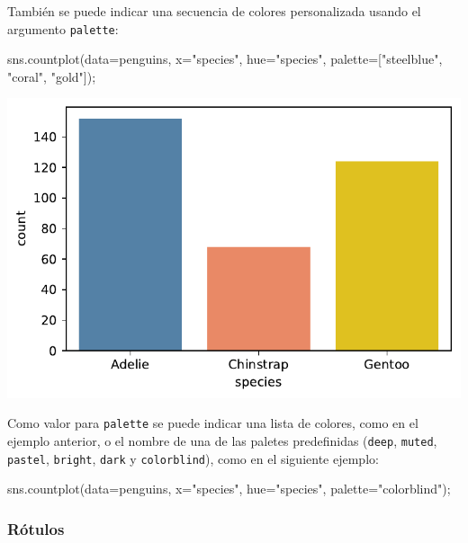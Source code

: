 \documentclass[
  a4paper,
  noprof,
  12pt,
  notoc,
  nosols,
  nobib]{mnye}
\newenvironment{Shaded}{\begin{snugshade}}{\end{snugshade}}
\newcommand{\NormalTok}[1]{\textcolor[rgb]{0.00,0.23,0.31}{#1}}
\newcommand{\OperatorTok}[1]{\textcolor[rgb]{0.37,0.37,0.37}{#1}}
\newcommand{\StringTok}[1]{\textcolor[rgb]{0.13,0.47,0.30}{#1}}
\theoremstyle{definition}
\theoremstyle{remark}
\begin{document}
También se puede indicar una secuencia de colores personalizada usando
el argumento \texttt{palette}:

\begin{Shaded}
\begin{Highlighting}[]
\NormalTok{sns.countplot(data}\OperatorTok{=}\NormalTok{penguins, x}\OperatorTok{=}\StringTok{"species"}\NormalTok{, hue}\OperatorTok{=}\StringTok{"species"}\NormalTok{, palette}\OperatorTok{=}\NormalTok{[}\StringTok{"steelblue"}\NormalTok{, }\StringTok{"coral"}\NormalTok{, }\StringTok{"gold"}\NormalTok{])}\OperatorTok{;}
\end{Highlighting}
\end{Shaded}

\includegraphics{chapters/1categorical_files/figure-pdf/cell-10-output-1.pdf}

Como valor para \texttt{palette} se puede indicar una lista de colores,
como en el ejemplo anterior, o el nombre de una de las paletes
predefinidas (\texttt{deep}, \texttt{muted}, \texttt{pastel},
\texttt{bright}, \texttt{dark} y \texttt{colorblind}), como en el
siguiente ejemplo:

\begin{Shaded}
\begin{Highlighting}[]
\NormalTok{sns.countplot(data}\OperatorTok{=}\NormalTok{penguins, x}\OperatorTok{=}\StringTok{"species"}\NormalTok{, hue}\OperatorTok{=}\StringTok{"species"}\NormalTok{, palette}\OperatorTok{=}\StringTok{"colorblind"}\NormalTok{)}\OperatorTok{;}
\end{Highlighting}
\end{Shaded}

\subsubsection{Rótulos}\label{ruxf3tulos}
\end{document}
